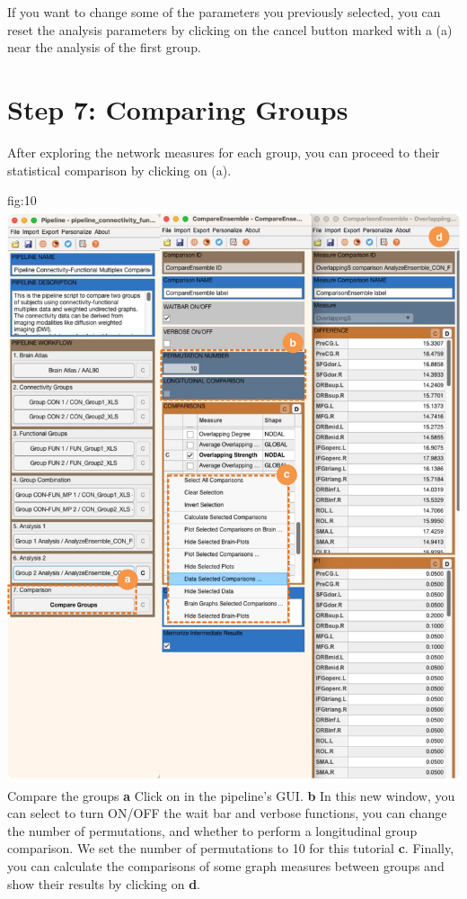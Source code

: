 \documentclass[justified]{tufte-handout}
\begin{document}
 	
If you want to change some of the parameters you previously selected, you can reset the analysis parameters by clicking on the cancel button marked with a  (a) near the analysis of the first group.
 
\clearpage

\section{Step 7: Comparing Groups}

After exploring the network measures for each group, you can proceed to their statistical comparison by clicking on  (a).

	{fig:10}
	{\includegraphics{fig10.jpg}}
	{Compare the groups}
	{
	{\bf a} Click on  in the pipeline's GUI.
	{\bf b} In this new window, you can select to turn ON/OFF the wait bar and verbose functions, you can change the number of permutations, and whether to perform a longitudinal group comparison. We set the number of permutations to 10 for this tutorial {\bf c}. Finally, you can calculate the comparisons of some graph measures between groups and show their results by clicking on  {\bf d}.
	}
\end{document}
